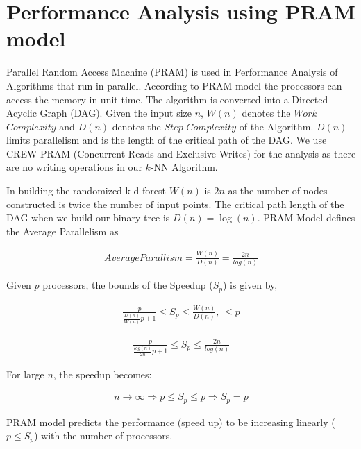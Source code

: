 \section{Performance Analysis using PRAM model}
  \label{sec:perf_analysis}

Parallel Random Access Machine (PRAM) is used in Performance Analysis of Algorithms that run in parallel. According to PRAM model the processors can access the memory in unit time. The algorithm is converted into a Directed Acyclic Graph (DAG). Given the input size $n$, $W(n)$ denotes the $Work$ $Complexity$ and $D(n)$ denotes the $Step$ $Complexity$ of the Algorithm. $D(n)$ limits parallelism and is the length of the critical path of the DAG. We use CREW-PRAM (Concurrent Reads and Exclusive Writes) for the analysis as there are no writing operations in our $k$-NN Algorithm. 

In building the randomized k-d forest $W(n)$ is $2n$ as the number of nodes constructed is twice the number of input points. The critical path length of the DAG when we build our binary tree is $D(n)=\operatorname{log}(n)$. PRAM Model defines the Average Parallelism as

\begin{align}
  Average Parallism = \frac{W(n)}{D(n)} = \frac{2n}{log(n)}%
\end{align}
 
 Given $p$ processors, the bounds of the Speedup ($S_p$) is given by,
 
 \begin{align}
   \frac{p}{\frac{D(n)}{W(n)} p+1} \leq S_p \leq \frac{W(n)}{D(n)}\text{, }\leq p
\end{align}  

\begin{align}
\frac{p}{\frac{log(n)}{2n} p+1} \leq S_p \leq \frac{2n}{log(n)}
\end{align}
\label{eq:sp_bounds}

For large $n$, the speedup becomes:

 \begin{align}
n\rightarrow \infty \Rightarrow p \leq S_p \leq p \Rightarrow S_p = p 
\end{align}
\label{eq:sp_bounds_min}

PRAM model predicts the performance (speed up) to be increasing linearly ($p \leq S_p$) with the number of processors. 
 

